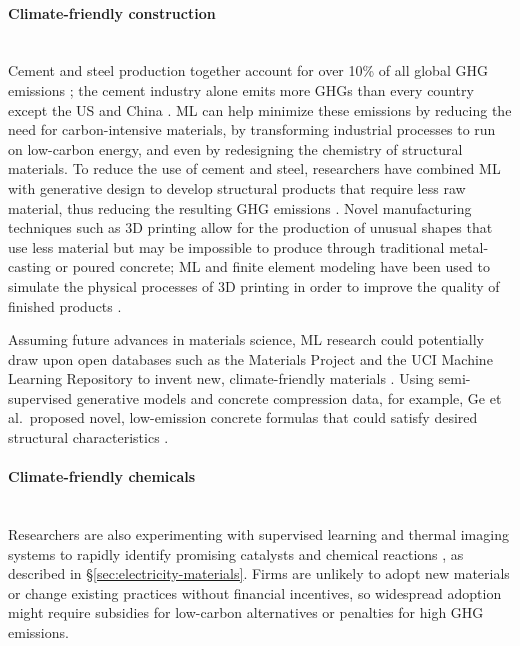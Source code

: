 \documentclass[11pt]{report}
\newcommand{\Gap}{\texorpdfstring{\hfill}{}}
\newcommand{\Rec}{\texorpdfstring{{\small\emph{\color{blue}{\fbox{High Leverage}}}}}{}}
\newcommand{\Longterm}{\texorpdfstring{{\small\emph{\color{OliveGreen}{\fbox{Long-term}}}}}{}}
\begin{document}
\paragraph*{Climate-friendly construction}\Gap \Rec\Longterm\mbox{}\\\label{sec:construction}Cement and steel production together account for over 10\% of all global GHG emissions \cite{fischedick2014industry}; the cement industry alone emits more GHGs than every country except the US and China \cite{lehne2018making}. ML can help minimize these emissions by reducing the need for carbon-intensive materials, by transforming industrial processes to run on low-carbon energy, and even by redesigning the chemistry of structural materials. To reduce the use of cement and steel, researchers have combined ML with generative design to develop structural products that require less raw material, thus reducing the resulting GHG emissions \cite{kazi2017dreamsketch}. Novel manufacturing techniques such as 3D printing allow for the production of unusual shapes that use less material but may be impossible to produce through traditional metal-casting or poured concrete; ML and finite element modeling have been used to simulate the physical processes of 3D printing in order to improve the quality of finished products \cite{baturynska}.

Assuming future advances in materials science, ML research could potentially draw upon open databases such as the Materials Project \cite{jain2013commentary} and the UCI Machine Learning Repository \cite{ge2019accelerated} to invent new, climate-friendly materials \cite{ward2016general}. Using semi-supervised generative models and concrete compression data, for example, Ge et al.~proposed novel, low-emission concrete formulas that could satisfy desired structural characteristics \cite{ge2019accelerated}.

\paragraph*{Climate-friendly chemicals}\Gap \Rec\Longterm\mbox{}\\\label{sec:chemicals}Researchers are also experimenting with supervised learning and thermal imaging systems to rapidly identify promising catalysts and chemical reactions \cite{rizkin2019, coley2019graph}, as described in \S\ref{sec:electricity-materials}. Firms are unlikely to adopt new materials or change existing practices without financial incentives, so widespread adoption might require subsidies for low-carbon alternatives or penalties for high GHG emissions.
\end{document}
